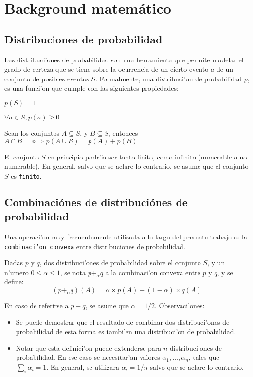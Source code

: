 
\section{Background matem\'atico}
\subsection{Distribuciones de probabilidad}
Las distribuci'ones de probabilidad son una herramienta que permite modelar el grado de certeza que se tiene sobre la ocurrencia de un 
cierto evento $a$ de un conjunto de posibles eventos $S$. 
Formalmente, una distribuci'on de probabilidad $p$, es una funci'on que cumple con las siguientes propiedades:

\begin{axiom}
$p(S) = 1$
\end{axiom}

\begin{axiom}
$\forall a \in S, p(a) \geq 0$
\end{axiom}

\begin{axiom}
Sean los conjuntos $A \subseteq S$, y $B \subseteq S$, entonces 
$A \cap B = \phi \Rightarrow p(A \cup B) = p(A) + p(B)$
\end{axiom}

El conjunto $S$ en principio podr'ia ser tanto finito, como infinito (numerable o no numerable). 
En general, salvo que se aclare lo contrario, se asume que el conjunto $S$ es \texttt{finito}.

\subsection{Combinaci\'ones de distribuci\'ones de probabilidad}
Una operaci'on muy frecuentemente utilizada a lo largo del presente trabajo es la \texttt{combinaci'on convexa} entre distribuciones
de probabilidad.

Dadas $p$ y $q$, dos distribuci'ones de probabilidad sobre el conjunto $S$, y un n'umero $0 \leq \alpha \leq 1$, 
se nota $p +_\alpha q$ a la combinaci'on convexa entre $p$ y $q$, y se define:
$$(p +_\alpha q)(A) = \alpha \times p(A) + (1-\alpha) \times q(A)$$ 

En caso de referirse a $p+q$, se asume que $\alpha = 1/2$. 
\newline \newline
Observaci'ones:
\begin{itemize}
 \item Se puede demostrar que el resultado de combinar dos distribuci'ones de probabilidad de esta forma es tambi'en una distribuci'on 
de probabilidad.

 \item Notar que esta definici'on puede extenderse para $n$ distribuci'ones de probabilidad. En ese caso se necesitar'an valores 
$\alpha_1, \dots, \alpha_n$, tales que $\sum_i \alpha_i = 1$. En general, se utilizara $\alpha_i = 1/n$ salvo que se aclare lo contrario.
\end{itemize}


